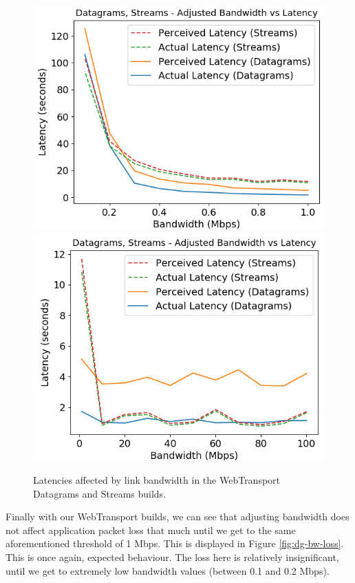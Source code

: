 \begin{figure}[h]
    \centering
    \includegraphics[width=0.49\linewidth]{images/bandwidth/dg-streams-bw-lat-small.png}  
    \includegraphics[width=0.49\linewidth]{images/bandwidth/dg-streams-bw-lat.png}    
    \caption{Latencies affected by link bandwidth in the WebTransport Datagrams and Streams builds.}

    \label{fig:dg-streams-bw-lat} 
\end{figure}

Finally with our WebTransport builds, we can see that adjusting bandwidth does not affect application packet loss that much until we get to the same aforementioned threshold of 1 Mbps. This is displayed in Figure \ref{fig:dg-bw-loss}. This is once again, expected behaviour. The loss here is relatively insignificant, until we get to extremely low bandwidth values (between 0.1 and 0.2 Mbps).

